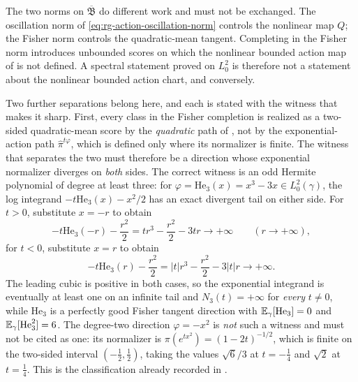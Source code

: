 The two norms on \(\overline{\mathfrak B}\) do different work and must not be
exchanged.  The oscillation norm of
\eqref{eq:rg-action-oscillation-norm} controls the nonlinear map \(Q\); the
Fisher norm controls the quadratic-mean tangent.  Completing in the Fisher norm
introduces unbounded scores on which the nonlinear bounded action map of
 is not defined.  A spectral statement
proved on \(L^2_0\) is therefore not a statement about the nonlinear bounded
action chart, and conversely. 

Two further separations belong here, and each is stated with the witness that
makes it sharp.  First, every class in the Fisher completion is realized as a
two-sided quadratic-mean score by the \emph{quadratic} path of
, not by the exponential-action path
\(\widehat\pi^{t\varphi}\), which is defined only where its normalizer is
finite.  The witness that separates the two must therefore be a direction whose
exponential normalizer diverges on \emph{both} sides.  The correct witness is an
odd Hermite polynomial of degree at least three: for
\(\varphi=\mathrm{He}_3(x)=x^3-3x\in L^2_0(\gamma)\), the log integrand
\(-t\mathrm{He}_3(x)-x^2/2\) has an exact divergent tail on either side.
For \(t>0\), substitute \(x=-r\) to obtain
\[
-t\mathrm{He}_3(-r)-\frac{r^2}{2}
=tr^3-\frac{r^2}{2}-3tr\longrightarrow+\infty
\qquad(r\to+\infty),
\]
for \(t<0\), substitute \(x=r\) to obtain
\[
-t\mathrm{He}_3(r)-\frac{r^2}{2}
=|t|r^3-\frac{r^2}{2}-3|t|r\longrightarrow+\infty.
\]
The leading cubic is positive in both cases, so the exponential integrand is
eventually at least one on an infinite tail and \(N_3(t)=+\infty\) for
\emph{every} \(t\ne0\), while
\(\mathrm{He}_3\) is a perfectly good Fisher tangent direction with
\(\mathbb E_\gamma[\mathrm{He}_3]=0\) and \(\mathbb E_\gamma[\mathrm{He}_3^2]=6\).  The
degree-two direction \(\varphi=-x^2\) is \emph{not} such a witness and must not
be cited as one: its normalizer is \(\pi(e^{tx^2})=(1-2t)^{-1/2}\), which is
finite on the two-sided interval \((-\tfrac12,\tfrac12)\), taking the values
\(\sqrt6/3\) at \(t=-\tfrac14\) and \(\sqrt2\) at \(t=\tfrac14\).  This is the
classification already recorded in
.  

